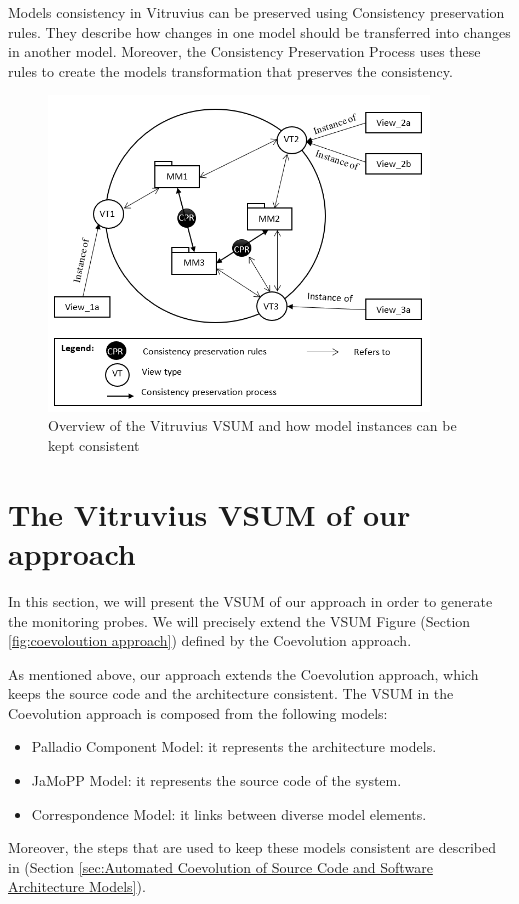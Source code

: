 Models consistency in Vitruvius can be preserved using Consistency preservation rules. They describe how changes in one model should be transferred into changes in another model. Moreover, the Consistency Preservation Process uses these rules to create the models transformation that preserves the consistency.


\begin{figure}[h]
\centering
\includegraphics[width=0.9\textwidth]{figures/vitruv_vsum}
\caption{Overview of the Vitruvius VSUM and how model instances can be kept consistent}
\label{fig:vitruv_vsum}
\end{figure}



\section{The Vitruvius VSUM of our approach}
\label{sec:The Vitruvius VSUM of our approach}

In this section, we will present the VSUM of our approach in order to generate the monitoring probes. We will precisely extend the VSUM Figure (Section \ref{fig:coevoloution approach}) defined by the Coevolution approach.

As mentioned above, our approach extends the Coevolution approach, which keeps the source code and the architecture consistent. The VSUM in the Coevolution approach is composed from the following models:
\begin{itemize}
\item Palladio Component Model: it represents the architecture models.
\item JaMoPP Model: it represents the source code of the system.
\item Correspondence Model: it links between diverse model elements.
\end{itemize}
Moreover, the steps that are used to keep these models consistent are described in (Section \ref{sec:Automated Coevolution of Source Code and Software Architecture Models}). 

